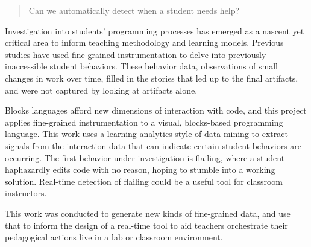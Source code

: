 % 
% 
%

\begin{quote}
Can we automatically detect when a student needs help?
\end{quote}
Investigation into students' programming processes has emerged as a nascent yet critical area to inform teaching methodology and learning models. Previous studies have used fine-grained instrumentation to delve into previously inaccessible student behaviors. These behavior data, observations of small changes in work over time, filled in the stories that led up to the final artifacts, and were not captured by looking at artifacts alone. 

Blocks languages afford new dimensions of interaction with code, and this project applies fine-grained instrumentation to a visual, blocks-based programming language. This work uses a learning analytics style of data mining to extract signals from the interaction data that can indicate certain student behaviors are occurring. The first behavior under investigation is flailing, where a student haphazardly edits code with no reason, hoping to stumble into a working solution. Real-time detection of flailing could be a useful tool for classroom instructors.

This work was conducted to generate new kinds of fine-grained data, and use that to inform the design of a real-time tool to aid teachers orchestrate their pedagogical actions live in a lab or classroom environment.
